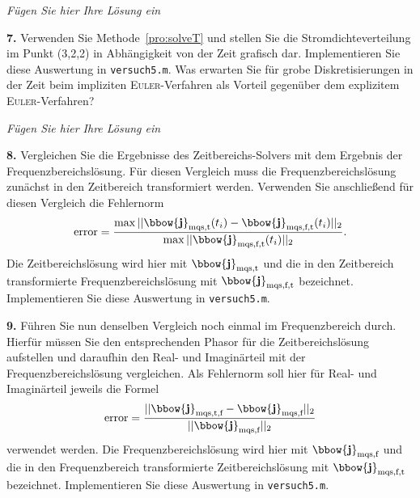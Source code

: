 \documentclass[Protokollheft.tex]{subfiles}
\begin{document}
\emph{Fügen Sie hier Ihre Lösung ein}

\begin{framed}
	\noindent \textbf{7.} Verwenden Sie Methode~\eqref{pro:solveT} und stellen Sie die Stromdichteverteilung im Punkt (3,2,2) in Abhängigkeit von der Zeit grafisch dar. Implementieren Sie diese Auswertung in \lstinline{versuch5.m}. Was erwarten Sie für grobe Diskretisierungen in der Zeit beim impliziten \textsc{Euler}-Verfahren als Vorteil gegenüber dem explizitem \textsc{Euler}-Verfahren?\label{exer:currDensityTimeDependent}
\end{framed}

\emph{Fügen Sie hier Ihre Lösung ein}

\begin{framed}
	\noindent \textbf{8.} Vergleichen Sie die Ergebnisse des Zeitbereichs-Solvers mit dem Ergebnis der Frequenzbereichslösung. Für diesen Vergleich muss die Frequenzbereichslösung zunächst in den Zeitbereich transformiert werden. Verwenden Sie anschließend für diesen Vergleich die Fehlernorm
      \begin{equation}
          \text{error} = \frac{\max||\bbow{\mathbf{j}}_\text{mqs,t}(t_i)-\bbow{\mathbf{j}}_\text{mqs,f,t}(t_i)||_2}{\max||\bbow{\mathbf{j}}_\text{mqs,f,t}(t_i)||_2}.
          \label{eq:errorNorm}
      \end{equation}
Die Zeitbereichslösung wird hier mit $\bbow{\mathbf{j}}_\text{mqs,t}$ und die in den Zeitbereich transformierte Frequenzbereichslösung mit $\bbow{\mathbf{j}}_\text{mqs,f,t}$ bezeichnet. Implementieren Sie diese Auswertung in \lstinline{versuch5.m}.\label{exer:compareFreqVStimeInTime}
\end{framed}


\begin{framed}
	\noindent \textbf{9.} Führen Sie nun denselben Vergleich noch einmal im Frequenzbereich durch. Hierfür müssen Sie den entsprechenden Phasor für die Zeitbereichslösung aufstellen und daraufhin den Real- und Imaginärteil mit der Frequenzbereichslösung vergleichen. Als Fehlernorm soll hier für Real- und Imaginärteil jeweils die Formel
    \begin{equation}
        \text{error} = \frac{||\bbow{\mathbf{j}}_\text{mqs,t,f}-\bbow{\mathbf{j}}_\text{mqs,f}||_2}{||\bbow{\mathbf{j}}_\text{mqs,f}||_2}
    \end{equation}
    verwendet werden. Die Frequenzbereichslösung wird hier mit $\bbow{\mathbf{j}}_\text{mqs,f}$ und die in den Frequenzbereich transformierte Zeitbereichslösung mit $\bbow{\mathbf{j}}_\text{mqs,f,t}$ bezeichnet. Implementieren Sie diese Auswertung in \lstinline{versuch5.m}.\label{exer:compareFreqVStimeInFreq}
\end{framed}
\end{document}
